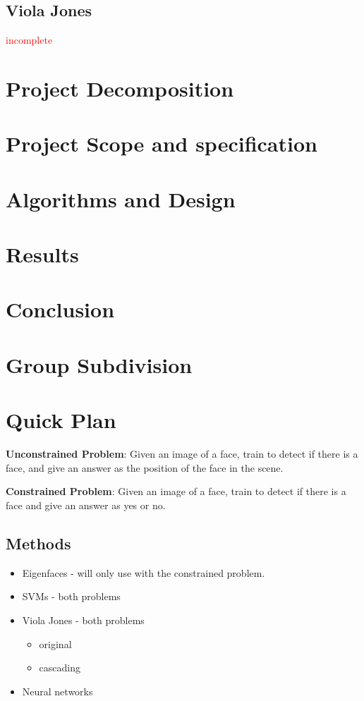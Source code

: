 \documentclass[11pt, twocolumn]{article} %
\theoremstyle{plain}
\theoremstyle{definition}
\theoremstyle{remark}
\numberwithin{equation}{section} %
\numberwithin{figure}{section} %
\numberwithin{table}{section} %
\begin{document}
\subsection{Viola Jones}
\textcolor{red}{incomplete}

\section{Project Decomposition} %




\section{Project Scope and specification} %

\section{Algorithms and Design} 

\section{Results}



\section{Conclusion}

\section{Group Subdivision}


\section{Quick Plan}

\textbf{Unconstrained Problem}: Given an image of a face, train to detect if there is a face, and give an answer as the position of the face in the scene.

\textbf{Constrained Problem}: Given an image of a face, train to detect if there is a face and give an answer as yes or no.

\subsection{Methods}
\begin{itemize}
  \item Eigenfaces - will only use with the constrained problem.
  \item SVMs - both problems
  \item Viola Jones - both problems
  \begin{itemize}
    \item original
    \item cascading
  \end{itemize}
  \item Neural networks
\end{itemize}
\end{document}
